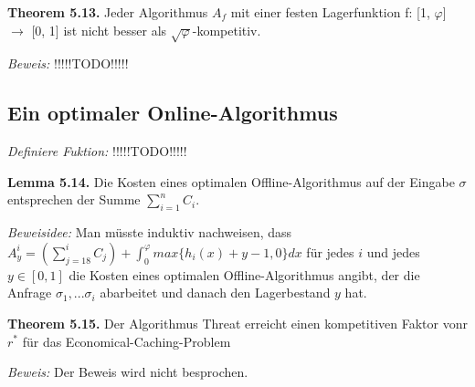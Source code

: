 \textbf{Theorem 5.13.} Jeder Algorithmus $A_{f}$ mit einer festen Lagerfunktion f: [1, $\varphi$] $\to$ [0, 1] ist nicht besser als $\sqrt{\varphi}$-kompetitiv.

\textit{Beweis:} !!!!!TODO!!!!!

\subsection{Ein optimaler Online-Algorithmus}

\textit{Definiere Fuktion:} !!!!!TODO!!!!!

\textbf{Lemma 5.14.} Die Kosten eines optimalen Offline-Algorithmus auf der Eingabe $\sigma$ entsprechen der Summe $\sum_{i=1}^{n} C_{i}$.

\textit{Beweisidee:} Man müsste induktiv nachweisen, dass $A_{y}^{i} = (\sum_{j=18}^{i} C_{j} ) + \int_{0}^{\varphi} max\{h_{i}(x) + y - 1, 0\} dx $ für jedes $i$ und jedes $y \in [0, 1]$ die Kosten eines optimalen Offline-Algorithmus angibt, der die Anfrage $\sigma_{1}, ... \sigma_{i}$ abarbeitet und danach den Lagerbestand $y$ hat.

\textbf{Theorem 5.15.} Der Algorithmus Threat erreicht einen kompetitiven Faktor vonr $r^{*}$ für das Economical-Caching-Problem

\textit{Beweis:} Der Beweis wird nicht besprochen.
